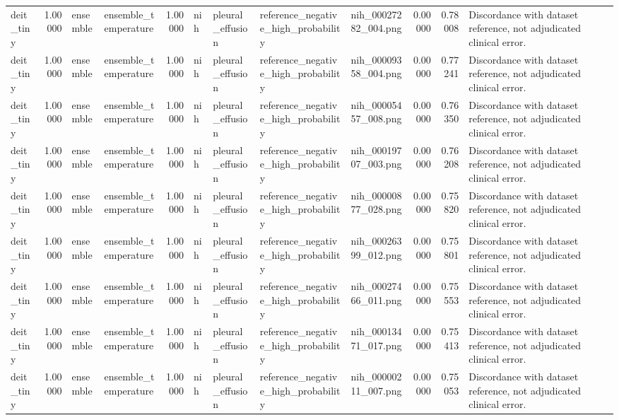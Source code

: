 \begin{tabular}{lrllrllllrrl}
deit\_tiny & 1.00000 & ensemble & ensemble\_temperature & 1.00000 & nih & pleural\_effusion & reference\_negative\_high\_probability & nih\_00027282\_004.png & 0.00000 & 0.78008 & Discordance with dataset reference, not adjudicated clinical error. \\
deit\_tiny & 1.00000 & ensemble & ensemble\_temperature & 1.00000 & nih & pleural\_effusion & reference\_negative\_high\_probability & nih\_00009358\_004.png & 0.00000 & 0.77241 & Discordance with dataset reference, not adjudicated clinical error. \\
deit\_tiny & 1.00000 & ensemble & ensemble\_temperature & 1.00000 & nih & pleural\_effusion & reference\_negative\_high\_probability & nih\_00005457\_008.png & 0.00000 & 0.76350 & Discordance with dataset reference, not adjudicated clinical error. \\
deit\_tiny & 1.00000 & ensemble & ensemble\_temperature & 1.00000 & nih & pleural\_effusion & reference\_negative\_high\_probability & nih\_00019707\_003.png & 0.00000 & 0.76208 & Discordance with dataset reference, not adjudicated clinical error. \\
deit\_tiny & 1.00000 & ensemble & ensemble\_temperature & 1.00000 & nih & pleural\_effusion & reference\_negative\_high\_probability & nih\_00000877\_028.png & 0.00000 & 0.75820 & Discordance with dataset reference, not adjudicated clinical error. \\
deit\_tiny & 1.00000 & ensemble & ensemble\_temperature & 1.00000 & nih & pleural\_effusion & reference\_negative\_high\_probability & nih\_00026399\_012.png & 0.00000 & 0.75801 & Discordance with dataset reference, not adjudicated clinical error. \\
deit\_tiny & 1.00000 & ensemble & ensemble\_temperature & 1.00000 & nih & pleural\_effusion & reference\_negative\_high\_probability & nih\_00027466\_011.png & 0.00000 & 0.75553 & Discordance with dataset reference, not adjudicated clinical error. \\
deit\_tiny & 1.00000 & ensemble & ensemble\_temperature & 1.00000 & nih & pleural\_effusion & reference\_negative\_high\_probability & nih\_00013471\_017.png & 0.00000 & 0.75413 & Discordance with dataset reference, not adjudicated clinical error. \\
deit\_tiny & 1.00000 & ensemble & ensemble\_temperature & 1.00000 & nih & pleural\_effusion & reference\_negative\_high\_probability & nih\_00000211\_007.png & 0.00000 & 0.75053 & Discordance with dataset reference, not adjudicated clinical error. \\

\end{tabular}
